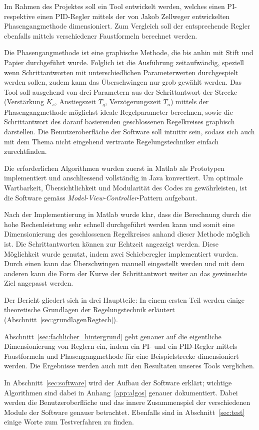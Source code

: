 Im Rahmen  des Projektes soll  ein Tool  entwickelt werden, welches  einen PI-
respektive  einen  PID-Regler mittels  der  von  Jakob Zellweger  entwickelten
Phasengangmethode dimensioniert. Zum  Vergleich soll der  entsprechende Regler
ebenfalls mittels verschiedener Faustformeln berechnet werden.

Die Phasengangmethode ist eine graphische Methode, die bis anhin mit Stift und
Papier  durchgef\"uhrt wurde. Folglich  ist die  Ausf\"uhrung zeitaufw\"andig,
speziell   wenn   Schrittantworten   mit   unterschiedlichen   Parameterwerten
durchgespielt werden sollen, zudem kann das \"Uberschwingen nur grob gew\"ahlt
werden. Das Tool  soll ausgehend  von drei  Parametern aus  der Schrittantwort
der  Strecke  (Verst\"arkung  $K_s$,  Anstiegszeit  $T_g$,  Verz\"ogerungszeit
$T_u$)  mittels   der  Phasengangmethode  m\"oglichst   ideale  Regelparameter
berechnen,  sowie  die  Schrittantwort des  darauf  basierenden  geschlossenen
Regelkreises graphisch darstellen. Die  Benutzeroberfl\"ache der Software soll
intuitiv  sein, sodass  sich  auch  mit dem  Thema  nicht eingehend  vertraute
Regelungstechniker einfach zurechtfinden.

Die    erforderlichen    Algorithmen    wurden   zuerst    in    Matlab    als
Prototypen   implementiert    und   anschliessend   vollst\"andig    in   Java
konvertiert. Um  optimale Wartbarkeit,  \"Ubersichtlichkeit und  Modularit\"at
des    Codes     zu    gew\"ahrleisten,    ist    die     Software    gem\"ass
\emph{Model-View-Controller}-Pattern aufgebaut.

Nach der Implementierung  in Matlab wurde klar, dass die  Berechnung durch die
hohe Rechenleistung  sehr schnell  durchgef\"uhrt werden  kann und  somit eine
Dimensionierung des geschlossenen Regelkreises anhand dieser Methode m\"oglich
ist. Die  Schrittantworten  k\"onnen   zur  Echtzeit  angezeigt  werden. Diese
M\"oglichkeit   wurde   genutzt,   indem  zwei   Schieberegler   implementiert
wurden. Durch einen  kann das  \"Uberschwingen manuell eingestellt  werden und
mit  dem anderen  kann die  Form der  Kurve der  Schrittantwort weiter  an das
gew\"unschte Ziel angepasst werden.

Der  Bericht   gliedert  sich  in   drei  Hauptteile: In  einem   ersten  Teil
werden  einige   theoretische  Grundlagen  der   Regelungstechnik  erl\"autert
(Abschnitt~\ref{sec:grundlagenRegtech}).

Abschnitt~\ref{sec:fachlicher_hintergrund}  geht genauer  auf die  eigentliche
Dimensionierung  von Reglern  ein, indem  ein PI-  und ein  PID-Regler mittels
Faustformeln  und Phasengangmethode  f\"ur eine  Beispielstrecke dimensioniert
werden. Die  Ergebnisse   werden  auch   mit  den  Resultaten   unseres  Tools
verglichen.

In    Abschnitt~\ref{sec:software}    wird    der    Aufbau    der    Software
erkl\"art;   wichtige  Algorithmen   sind   dabei  in   Anhang~\ref{app:algos}
genauer   dokumentiert. Dabei   werden   die  Benutzeroberfl\"ache   und   das
innere   Zusammenspiel  der   verschiedenen   Module   der  Software   genauer
betrachtet. Ebenfalls  sind  in   Abschnitt~\ref{sec:test}  einige  Worte  zum
Testverfahren zu finden.
